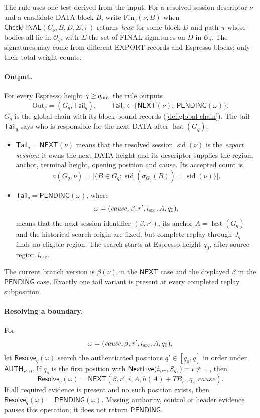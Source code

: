 \documentclass[11pt,a4paper]{article}
\newcommand{\TB}{\mathit{TB}}
\newcommand{\tagg}[1]{\ensuremath{\mathsf{#1}}}
\newcommand{\defterm}[1]{\textcolor{rrBlue}{\textit{#1}}}
\begin{document}
The rule uses one test derived from the input. For a resolved session
descriptor $\nu$ and a candidate DATA block $B$, write
$\mathrm{Fin}_q(\nu,B)$ when
$\tagg{CheckFINAL}(C_\nu,B,D,\Sigma,\pi)$ returns \emph{true} for
some block $D$ and path $\pi$ whose bodies all lie in $\mathcal O_q$, with
$\Sigma$ the set of FINAL signatures on $D$ in $\mathcal O_q$. The
signatures may come from different EXPORT records and Espresso blocks;
only their total weight counts.

\paragraph{Output.}
For every Espresso height $q\ge q_{\rm init}$ the rule outputs
\[
 \boxed{\mathrm{Out}_q=(G_q,\mathsf{Tail}_q)},\qquad
 \mathsf{Tail}_q\in\{\tagg{NEXT}(\nu),\ \tagg{PENDING}(\omega)\}.
\]
$G_q$ is the global chain with its block-bound records
(\cref{def:global-chain}).  The tail $\mathsf{Tail}_q$ says who is responsible for
the next DATA after $\operatorname{last}(G_q)$:
\begin{itemize}[itemsep=2pt]
\item $\mathsf{Tail}_q=\tagg{NEXT}(\nu)$ means that the resolved session
$\operatorname{sid}(\nu)$ is the \defterm{export session}: it owns the
next DATA height and its descriptor supplies the region, anchor,
terminal height, opening position and cause.  Its accepted count is
\[
 a(G_q,\nu)=
 \bigl|\{B\in G_q:\operatorname{sid}(\sigma_{G_q}(B))
                 =\operatorname{sid}(\nu)\}\bigr|.
 \]
\item $\mathsf{Tail}_q=\tagg{PENDING}(\omega)$, where
\[
 \omega=(\mathit{cause},\beta,r',i_{\rm src},A,q_0),
\]
means that the next session identifier $(\beta,r')$, its anchor
$A=\operatorname{last}(G_q)$ and the historical search origin are fixed,
but complete replay through $J_q$ finds no eligible region.  The search
starts at Espresso height $q_0$, after source region $i_{\rm src}$.
\end{itemize}
The current branch version is $\beta(\nu)$ in the \tagg{NEXT} case and
the displayed $\beta$ in the \tagg{PENDING} case.  Exactly one tail
variant is present at every completed replay subposition.

\paragraph{Resolving a boundary.}
For
\[
 \omega=(\mathit{cause},\beta,r',i_{\rm src},A,q_0),
\]
let $\tagg{Resolve}_q(\omega)$ search the authenticated positions
$q'\in[q_0,q]$ in order under $\tagg{AUTH}_{r',0}$.  If $q_s$ is the
first position with
$\tagg{NextLive}(i_{\rm src},S_{q_s})=i\ne\bot$, then
\[
 \tagg{Resolve}_q(\omega)=\tagg{NEXT}
 (\beta,r',i,A,h(A)+\TB_{r'},q_s,\mathit{cause}).
\]
If all required evidence is present and no such position exists, then
$\tagg{Resolve}_q(\omega)=\tagg{PENDING}(\omega)$.  Missing authority,
control or header evidence pauses this operation; it does not return
\tagg{PENDING}.
\end{document}
